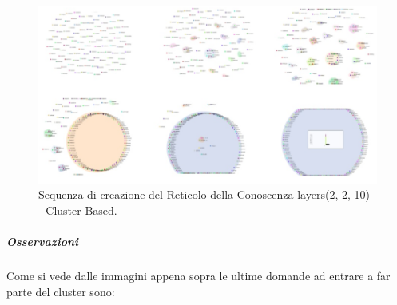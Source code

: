 \begin{figure}[H]
\centering
	\includegraphics[width=0.70\linewidth]{./image/collage_reticolo-sql(2,2,10).png}
	\caption{Sequenza di creazione del Reticolo della Conoscenza layers(2, 2, 10) - Cluster Based.}
	\label{Sequenza di creazione del Reticolo della Conoscenza layers(2, 2, 10) - Cluster Based.}
\end{figure}
\noindent

\subparagraph{Osservazioni}\mbox{}
\noindent
Come si vede dalle immagini appena sopra le ultime domande ad entrare a far parte del cluster sono:


